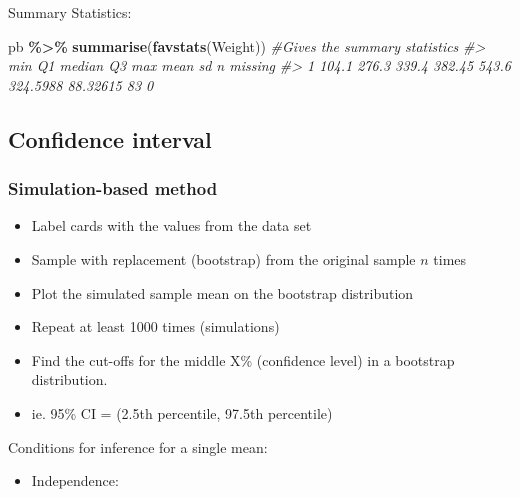 \documentclass[
]{report}
\newenvironment{Shaded}{\begin{snugshade}}{\end{snugshade}}
\newcommand{\AttributeTok}[1]{\textcolor[rgb]{0.13,0.29,0.53}{#1}}
\newcommand{\CommentTok}[1]{\textcolor[rgb]{0.56,0.35,0.01}{\textit{#1}}}
\newcommand{\DecValTok}[1]{\textcolor[rgb]{0.00,0.00,0.81}{#1}}
\newcommand{\FloatTok}[1]{\textcolor[rgb]{0.00,0.00,0.81}{#1}}
\newcommand{\FunctionTok}[1]{\textcolor[rgb]{0.13,0.29,0.53}{\textbf{#1}}}
\newcommand{\NormalTok}[1]{#1}
\newcommand{\SpecialCharTok}[1]{\textcolor[rgb]{0.81,0.36,0.00}{\textbf{#1}}}
\newcommand{\StringTok}[1]{\textcolor[rgb]{0.31,0.60,0.02}{#1}}
\providecommand{\tightlist}{%
  \setlength{\itemsep}{0pt}\setlength{\parskip}{0pt}}
\begin{document}
Summary Statistics:

\begin{Shaded}
\begin{Highlighting}[]
\NormalTok{pb }\SpecialCharTok{\%\textgreater{}\%}
  \FunctionTok{summarise}\NormalTok{(}\FunctionTok{favstats}\NormalTok{(Weight)) }\CommentTok{\#Gives the summary statistics}
\CommentTok{\#\textgreater{}     min    Q1 median     Q3   max     mean       sd  n missing}
\CommentTok{\#\textgreater{} 1 104.1 276.3  339.4 382.45 543.6 324.5988 88.32615 83       0}
\end{Highlighting}
\end{Shaded}

\subsection*{Confidence interval}\label{confidence-interval}

\subsubsection*{Simulation-based method}\label{simulation-based-method-1}

\begin{itemize}
\item
  Label cards with the values from the data set
\item
  Sample with replacement (bootstrap) from the original sample \(n\) times
\item
  Plot the simulated sample mean on the bootstrap distribution
\item
  Repeat at least 1000 times (simulations)
\item
  Find the cut-offs for the middle X\% (confidence level) in a bootstrap distribution.
\item
  ie. 95\% CI = (2.5th percentile, 97.5th percentile)
\end{itemize}

Conditions for inference for a single mean:

\begin{itemize}
\tightlist
\item
  Independence:
\end{itemize}

\vspace{0.5in}

\begin{Shaded}
\end{Shaded}
\end{document}
